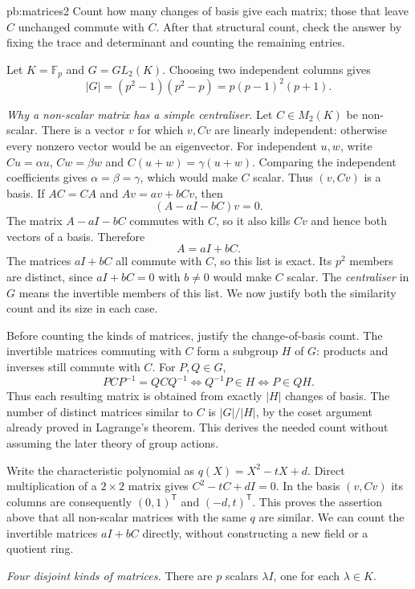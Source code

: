 \begin{solution}{pb:matrices2}
\idea Count how many changes of basis give each matrix; those that leave
$C$ unchanged commute with $C$. After that structural count, check the
answer by fixing the trace and determinant and counting the remaining entries.

\writeup Let $K=\mathbb F_p$ and $G=GL_2(K)$. Choosing two independent columns gives
\[
|G|=(p^2-1)(p^2-p)=p(p-1)^2(p+1).
\]

\emph{Why a non-scalar matrix has a simple centraliser.}
Let $C\in M_2(K)$ be non-scalar. There is a vector $v$ for which $v,Cv$ are linearly independent: otherwise every nonzero vector would be an eigenvector. For independent $u,w$, write $Cu=\alpha u$, $Cw=\beta w$ and $C(u+w)=\gamma(u+w)$. Comparing the independent coefficients gives $\alpha=\beta=\gamma$, which would make $C$ scalar. Thus $(v,Cv)$ is a basis. If $AC=CA$ and $Av=av+bCv$, then
\[
(A-aI-bC)v=0.
\]
The matrix $A-aI-bC$ commutes with $C$, so it also kills $Cv$ and hence both vectors of a basis. Therefore
\[
A=aI+bC.
\]
The matrices $aI+bC$ all commute with $C$, so this list is exact. Its $p^2$ members are distinct, since $aI+bC=0$ with $b\ne0$ would make $C$ scalar. The \emph{centraliser} in $G$ means the invertible members of this list. We now justify both the similarity count and its size in each case.

Before counting the kinds of matrices, justify the change-of-basis count. The invertible matrices commuting with $C$ form a subgroup $H$ of $G$: products and inverses still commute with $C$. For $P,Q\in G$,
\[
PCP^{-1}=QCQ^{-1}\iff Q^{-1}P\in H\iff P\in QH.
\]
Thus each resulting matrix is obtained from exactly $|H|$ changes of basis. The number of distinct matrices similar to $C$ is $|G|/|H|$, by the coset argument already proved in Lagrange's theorem. This derives the needed count without assuming the later theory of group actions.

Write the characteristic polynomial as $q(X)=X^2-tX+d$. Direct multiplication of a $2\times2$ matrix gives $C^2-tC+dI=0$. In the basis $(v,Cv)$ its columns are consequently $(0,1)^{\mathsf T}$ and $(-d,t)^{\mathsf T}$. This proves the assertion above that all non-scalar matrices with the same $q$ are similar. We can count the invertible matrices $aI+bC$ directly, without constructing a new field or a quotient ring.

\emph{Four disjoint kinds of matrices.}
There are $p$ scalars $\lambda I$, one for each $\lambda\in K$.


\end{solution}
